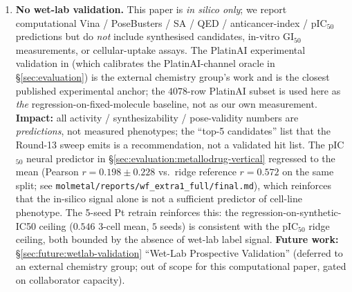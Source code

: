 \begin{enumerate}
  \item \textbf{No wet-lab validation.}\label{sec:limitations:no-wetlab}
  This paper is \emph{in silico only}; we report computational
  Vina / PoseBusters / SA / QED / anticancer-index /
  pIC$_{50}$ predictions but do \emph{not} include synthesised
  candidates, in-vitro $\mathrm{GI}_{50}$ measurements, or
  cellular-uptake assays.  The PlatinAI experimental validation
  in \citep{rusanov2025platinai} (which calibrates the
  PlatinAI-channel oracle in \S\ref{sec:evaluation}) is the
  external chemistry group's work and is the closest published
  experimental anchor; the $4078$-row PlatinAI subset is used
  here as \emph{the} regression-on-fixed-molecule baseline, not
  as our own measurement.  \textbf{Impact:} all activity /
  synthesizability / pose-validity numbers are \emph{predictions},
  not measured phenotypes; the ``top-5 candidates'' list that
  the Round-13 sweep emits is a recommendation, not a validated
  hit list.  The pIC$_{50}$ neural predictor in
  \S\ref{sec:evaluation:metallodrug-vertical} regressed to the
  mean (Pearson $r = 0.198 \pm 0.228$ vs.\ ridge reference
  $r = 0.572$ on the same split; see
  \texttt{molmetal/reports/wf\_extra1\_full/final.md}), which
  reinforces that the in-silico signal alone is not a sufficient
  predictor of cell-line phenotype.  The 5-seed Pt retrain
  reinforces this: the regression-on-synthetic-IC50 ceiling
  ($0.546$ 3-cell mean, $5$ seeds) is consistent with the
  pIC$_{50}$ ridge ceiling, both bounded by the absence of
  wet-lab label signal.
  \textbf{Future work:} \S\ref{sec:future:wetlab-validation}
  ``Wet-Lab Prospective Validation'' (deferred to an external
  chemistry group; out of scope for this computational paper,
  gated on collaborator capacity).

\end{enumerate}

\bigskip

